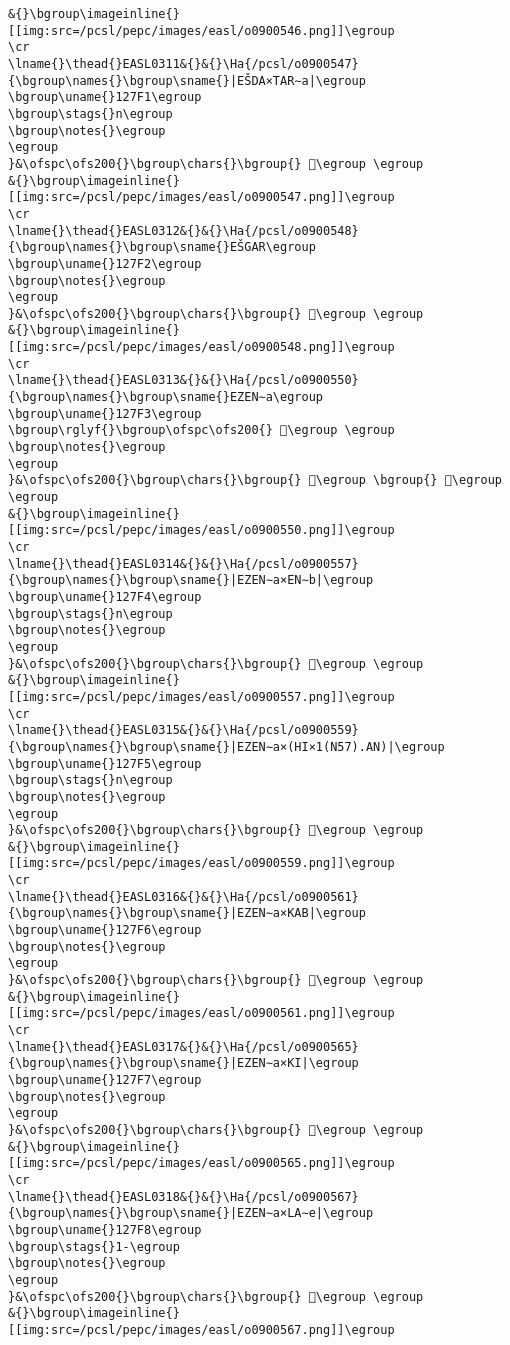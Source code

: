 \begin{verbatim}
&{}\bgroup\imageinline{}[[img:src=/pcsl/pepc/images/easl/o0900546.png]]\egroup
\cr
\lname{}\thead{}EASL0311&{}&{}\Ha{/pcsl/o0900547}{\bgroup\names{}\bgroup\sname{}|EŠDA×TAR∼a|\egroup
\bgroup\uname{}127F1\egroup
\bgroup\stags{}n\egroup
\bgroup\notes{}\egroup
\egroup
}&\ofspc\ofs200{}\bgroup\chars{}\bgroup{} 𒟱\egroup \egroup
&{}\bgroup\imageinline{}[[img:src=/pcsl/pepc/images/easl/o0900547.png]]\egroup
\cr
\lname{}\thead{}EASL0312&{}&{}\Ha{/pcsl/o0900548}{\bgroup\names{}\bgroup\sname{}EŠGAR\egroup
\bgroup\uname{}127F2\egroup
\bgroup\notes{}\egroup
\egroup
}&\ofspc\ofs200{}\bgroup\chars{}\bgroup{} 𒟲\egroup \egroup
&{}\bgroup\imageinline{}[[img:src=/pcsl/pepc/images/easl/o0900548.png]]\egroup
\cr
\lname{}\thead{}EASL0313&{}&{}\Ha{/pcsl/o0900550}{\bgroup\names{}\bgroup\sname{}EZEN∼a\egroup
\bgroup\uname{}127F3\egroup
\bgroup\rglyf{}\bgroup\ofspc\ofs200{} 𒟳\egroup \egroup
\bgroup\notes{}\egroup
\egroup
}&\ofspc\ofs200{}\bgroup\chars{}\bgroup{} 𒠁\egroup \bgroup{} 𒟳\egroup \egroup
&{}\bgroup\imageinline{}[[img:src=/pcsl/pepc/images/easl/o0900550.png]]\egroup
\cr
\lname{}\thead{}EASL0314&{}&{}\Ha{/pcsl/o0900557}{\bgroup\names{}\bgroup\sname{}|EZEN∼a×EN∼b|\egroup
\bgroup\uname{}127F4\egroup
\bgroup\stags{}n\egroup
\bgroup\notes{}\egroup
\egroup
}&\ofspc\ofs200{}\bgroup\chars{}\bgroup{} 𒟴\egroup \egroup
&{}\bgroup\imageinline{}[[img:src=/pcsl/pepc/images/easl/o0900557.png]]\egroup
\cr
\lname{}\thead{}EASL0315&{}&{}\Ha{/pcsl/o0900559}{\bgroup\names{}\bgroup\sname{}|EZEN∼a×(HI×1(N57).AN)|\egroup
\bgroup\uname{}127F5\egroup
\bgroup\stags{}n\egroup
\bgroup\notes{}\egroup
\egroup
}&\ofspc\ofs200{}\bgroup\chars{}\bgroup{} 𒟵\egroup \egroup
&{}\bgroup\imageinline{}[[img:src=/pcsl/pepc/images/easl/o0900559.png]]\egroup
\cr
\lname{}\thead{}EASL0316&{}&{}\Ha{/pcsl/o0900561}{\bgroup\names{}\bgroup\sname{}|EZEN∼a×KAB|\egroup
\bgroup\uname{}127F6\egroup
\bgroup\notes{}\egroup
\egroup
}&\ofspc\ofs200{}\bgroup\chars{}\bgroup{} 𒟶\egroup \egroup
&{}\bgroup\imageinline{}[[img:src=/pcsl/pepc/images/easl/o0900561.png]]\egroup
\cr
\lname{}\thead{}EASL0317&{}&{}\Ha{/pcsl/o0900565}{\bgroup\names{}\bgroup\sname{}|EZEN∼a×KI|\egroup
\bgroup\uname{}127F7\egroup
\bgroup\notes{}\egroup
\egroup
}&\ofspc\ofs200{}\bgroup\chars{}\bgroup{} 𒟷\egroup \egroup
&{}\bgroup\imageinline{}[[img:src=/pcsl/pepc/images/easl/o0900565.png]]\egroup
\cr
\lname{}\thead{}EASL0318&{}&{}\Ha{/pcsl/o0900567}{\bgroup\names{}\bgroup\sname{}|EZEN∼a×LA∼e|\egroup
\bgroup\uname{}127F8\egroup
\bgroup\stags{}1-\egroup
\bgroup\notes{}\egroup
\egroup
}&\ofspc\ofs200{}\bgroup\chars{}\bgroup{} 𒟸\egroup \egroup
&{}\bgroup\imageinline{}[[img:src=/pcsl/pepc/images/easl/o0900567.png]]\egroup

\end{verbatim}
